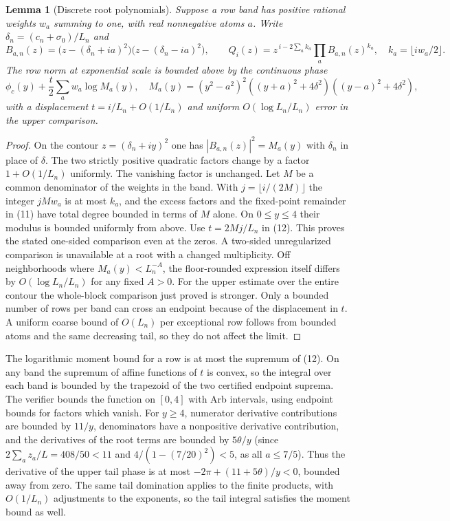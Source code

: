 \IfFileExists{TS1cmr.fd}{\documentclass[11pt]{article}}
\newtheorem{lemma}[theorem]{Lemma}
\begin{document}
\begin{lemma}[Discrete root polynomials]
Suppose a row band has positive rational weights \(w_a\)
summing to one, with real nonnegative atoms \(a\).
Write \(\delta_n=(c_n+\sigma_0)/L_n\) and
\[
 B_{a,n}(z)=\big(z-(\delta_n+ia)^2\big)\big(z-(\delta_n-ia)^2\big),
 \qquad
 Q_i(z)=z^{\,i-2\sum_a k_a}\prod_a B_{a,n}(z)^{k_a},
 \quad k_a=\lfloor iw_a/2\rfloor .
 \tag{11}
\]
The row norm at exponential scale is bounded above by the
continuous phase
\[
 \phi_c(y)+\frac{t}{2}\sum_a w_a\log M_a(y),
 \quad
 M_a(y)=(y^2-a^2)^2((y+a)^2+4\delta^2)((y-a)^2+4\delta^2),
 \tag{12}
\]
with a displacement \(t=i/L_n+O(1/L_n)\) and uniform
\(O(\log L_n/L_n)\) error in the upper comparison.
\end{lemma}
\begin{proof}
On the contour \(z=(\delta_n+iy)^2\) one has
\(|B_{a,n}(z)|^2=M_a(y)\) with \(\delta_n\) in place of
\(\delta\). The two strictly positive quadratic factors change
by a factor \(1+O(1/L_n)\) uniformly. The vanishing factor is
unchanged. Let \(M\) be a common denominator of the weights
in the band. With \(j=\lfloor i/(2M)\rfloor\) the integer
\(jMw_a\) is at most \(k_a\), and the excess factors and the
fixed-point remainder in (11) have total degree bounded in
terms of \(M\) alone. On \(0\le y\le4\) their modulus is
bounded uniformly from above. Use \(t=2Mj/L_n\) in (12).
This proves the stated one-sided comparison even at the
zeros. A two-sided unregularized comparison is unavailable
at a root with a changed multiplicity. Off neighborhoods
where \(M_a(y)<L_n^{-A}\), the floor-rounded expression
itself differs by \(O(\log L_n/L_n)\) for any fixed \(A>0\).
For the upper estimate over the entire contour the
whole-block comparison just proved is stronger. Only a
bounded number of rows per band can cross an endpoint because
of the displacement in \(t\). A uniform coarse bound of
\(O(L_n)\) per exceptional row follows from bounded atoms
and the same decreasing tail, so they do not affect the limit.
\end{proof}

The logarithmic moment bound for a row is at most the supremum
of (12). On any band the supremum of affine functions of
\(t\) is convex, so the integral over each band is bounded by
the trapezoid of the two certified endpoint suprema.
The verifier bounds the function on \([0,4]\) with Arb
intervals, using endpoint bounds for factors which vanish.
For \(y\ge4\), numerator derivative contributions are bounded
by \(11/y\), denominators have a nonpositive derivative
contribution, and the derivatives of the root terms are
bounded by \(5\theta/y\) (since \(2\sum_a z_a / L = 408/50 < 11\)
and \(4/(1 - (7/20)^2) < 5\), as all \(a\le7/5\)). Thus the derivative
of the upper tail phase is at most
\(-2\pi+(11+5\theta)/y<0\), bounded away from zero.
The same tail domination applies to the finite products,
with \(O(1/L_n)\) adjustments to the exponents, so the
tail integral satisfies the moment bound as well.
\end{document}

